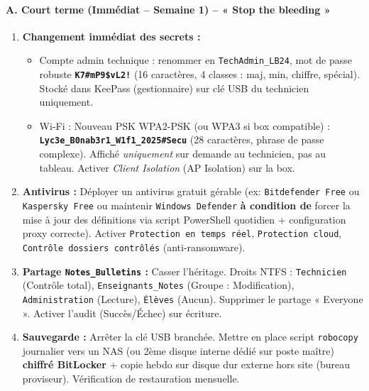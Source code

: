 \documentclass[11pt]{article}
\begin{document}
\begin{exoresolu}
\paragraph{A. Court terme (Immédiat -- Semaine 1) -- « Stop the bleeding »}
\begin{enumerate}
    \item \textbf{Changement immédiat des secrets :}
    \begin{itemize}
        \item Compte admin technique : renommer en \texttt{TechAdmin\_LB24}, mot de passe robuste \textbf{\texttt{K7\#mP9\$vL2!}} (16 caractères, 4 classes : maj, min, chiffre, spécial). Stocké dans KeePass (gestionnaire) sur clé USB du technicien uniquement.
        \item Wi-Fi : Nouveau PSK WPA2-PSK (ou WPA3 si box compatible) : \textbf{\texttt{Lyc3e\_B0nab3r1\_W1f1\_2025\#Secu}} (28 caractères, phrase de passe complexe). Affiché \emph{uniquement} sur demande au technicien, pas au tableau. Activer \emph{Client Isolation} (AP Isolation) sur la box.
    \end{itemize}
    \item \textbf{Antivirus :} Déployer un antivirus gratuit gérable (ex: \texttt{Bitdefender Free} ou \texttt{Kaspersky Free} ou maintenir \texttt{Windows Defender} \textbf{à condition de} forcer la mise à jour des définitions via script PowerShell quotidien + configuration proxy correcte). Activer \texttt{Protection en temps réel}, \texttt{Protection cloud}, \texttt{Contrôle dossiers contrôlés} (anti-ransomware).
    \item \textbf{Partage \texttt{Notes\_Bulletins} :} Casser l'héritage. Droits NTFS : \texttt{Technicien} (Contrôle total), \texttt{Enseignants\_Notes} (Groupe : Modification), \texttt{Administration} (Lecture), \texttt{Élèves} (Aucun). Supprimer le partage « Everyone ». Activer l'audit (Succès/Échec) sur écriture.
    \item \textbf{Sauvegarde :} Arrêter la clé USB branchée. Mettre en place script \texttt{robocopy} journalier vers un NAS (ou 2ème disque interne dédié sur poste maître) \textbf{chiffré BitLocker} + copie hebdo sur disque dur externe hors site (bureau proviseur). Vérification de restauration mensuelle.
\end{enumerate}


\end{exoresolu}
\end{document}
